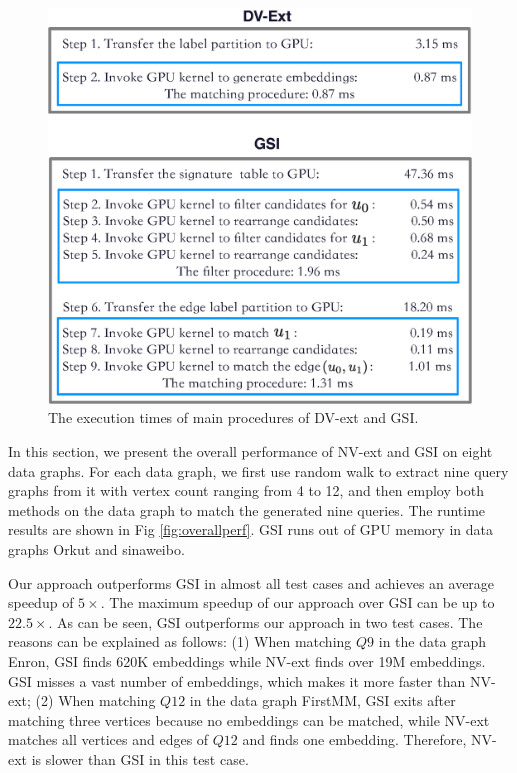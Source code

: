 \begin{figure}
\centering
\includegraphics[width=\columnwidth]{./figure/comparegsi.eps}
\caption{The execution times of main procedures of DV-ext and GSI.}	
\label{fig:compdvgsi}
\end{figure}
In this section, we present the overall performance of NV-ext and GSI on eight data graphs. For each data graph, we first use random walk to extract nine query graphs from it with vertex count ranging from 4 to 12, and then employ both methods on the data graph to match the generated nine queries. The runtime results are shown in Fig \ref{fig:overallperf}. GSI runs out of GPU memory in data graphs Orkut and sinaweibo.

Our approach outperforms GSI in almost all test cases and achieves an average speedup of $5\times$. The maximum speedup of our approach over GSI can be up to $22.5\times$. As can be seen, GSI outperforms our approach in two test cases. The reasons can be explained as follows: (1) When matching $Q9$ in the data graph Enron, GSI finds 620K embeddings while NV-ext finds over 19M embeddings. GSI misses a vast number of embeddings, which makes it more faster than NV-ext; (2) When matching $Q12$ in the data graph FirstMM, GSI exits after matching three vertices because no embeddings can be matched, while NV-ext matches all vertices and edges of $Q12$ and finds one embedding. Therefore, NV-ext is slower than GSI in this test case.

